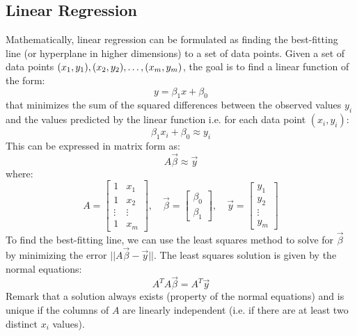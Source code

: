 \subsection{Linear Regression}
Mathematically, linear regression can be formulated as finding the best-fitting line (or hyperplane in higher dimensions) to a set of data points. Given a set of data points $(x_1, y_1), (x_2, y_2), \ldots, \\ (x_m, y_m)$, the goal is to find a linear function of the form:
\[    y = \beta_1 x + \beta_0
\]
that minimizes the sum of the squared differences between the observed values $y_i$ and the values predicted by the linear function i.e. for each data point $(x_i, y_i)$:
\[
    \beta_1 x_i + \beta_0 \approx y_i
\]
This can be expressed in matrix form as:
\[
    A \vec{\beta} \approx \vec{y}
\]
where:
\[
    A = \begin{bmatrix}
        1 & x_1 \\ 1 & x_2 \\ \vdots & \vdots \\ 1 & x_m
    \end{bmatrix}, \quad \vec{\beta} = \begin{bmatrix}
        \beta_0 \\ \beta_1
    \end{bmatrix}, \quad \vec{y} = \begin{bmatrix}
        y_1 \\ y_2 \\ \vdots \\ y_m
    \end{bmatrix}
\]
To find the best-fitting line, we can use the least squares method to solve for $\vec{\beta}$ by minimizing the error $||A \vec{\beta} - \vec{y}||$. The least squares solution is given by the normal equations:
\[
    A^T A \vec{\beta} = A^T \vec{y}
\]
Remark that a solution always exists (property of the normal equations) and is unique if the columns of $A$ are linearly independent (i.e. if there are at least two distinct $x_i$ values).